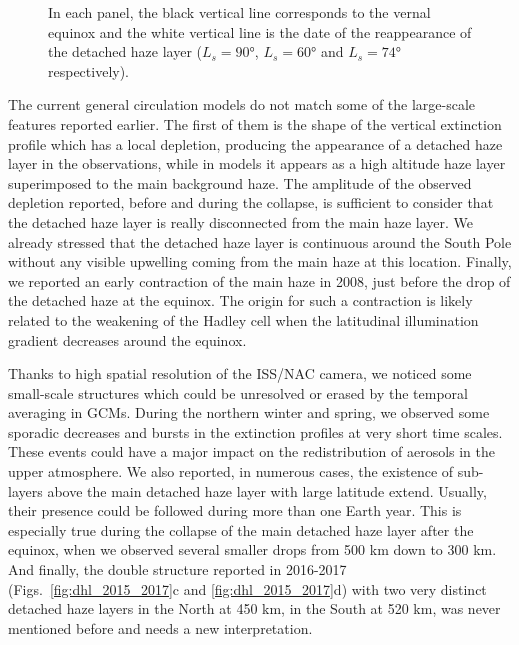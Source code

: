 \begin{figure}[!ht]
\caption{
In each panel, the black vertical line corresponds to the vernal equinox 
and the white vertical line is the date of the reappearance of the detached haze layer ($L_s = \ang{90}$, $L_s = \ang{60}$ and $L_s = \ang{74}$ respectively).}
\label{fig:gcm_cycle}
\end{figure}

The current general circulation models do not match some of the large-scale features reported earlier. The first of them
is the shape of the vertical extinction profile which has a local depletion, producing the appearance of a detached haze layer in the
observations, while in models it appears as a high altitude haze layer superimposed to the main background haze.
The amplitude of the observed depletion reported, before and during the collapse, is sufficient to consider that the
detached haze layer is really disconnected from the main haze layer. We already stressed that the detached haze layer is
continuous around the South Pole without any visible upwelling coming from the main haze at this location. Finally, we
reported an early contraction of the main haze in 2008, just before the drop of the detached haze at the equinox. The origin
for such a contraction is likely related to the weakening of the Hadley cell when the latitudinal illumination gradient
decreases around the equinox.

Thanks to high spatial resolution of the ISS/NAC camera, we noticed some small-scale structures which could be unresolved or
erased by the temporal averaging in GCMs. During the northern winter and spring, we observed some sporadic decreases and
bursts in the extinction profiles at very short time scales. These events could have a major impact on the redistribution of
aerosols in the upper atmosphere. We also reported, in numerous cases, the existence of sub-layers above the main detached
haze layer with large latitude extend. Usually, their presence could be followed during more than one Earth year. This is
especially true during the collapse of the main detached haze layer after the equinox, when we observed several smaller
drops from 500 km down to 300 km. And finally, the double structure reported in 2016-2017
(Figs.~\ref{fig:dhl_2015_2017}c and \ref{fig:dhl_2015_2017}d) with two very distinct detached haze layers in the
North at 450 km, in the South at 520 km, was never mentioned before and needs a new interpretation.

